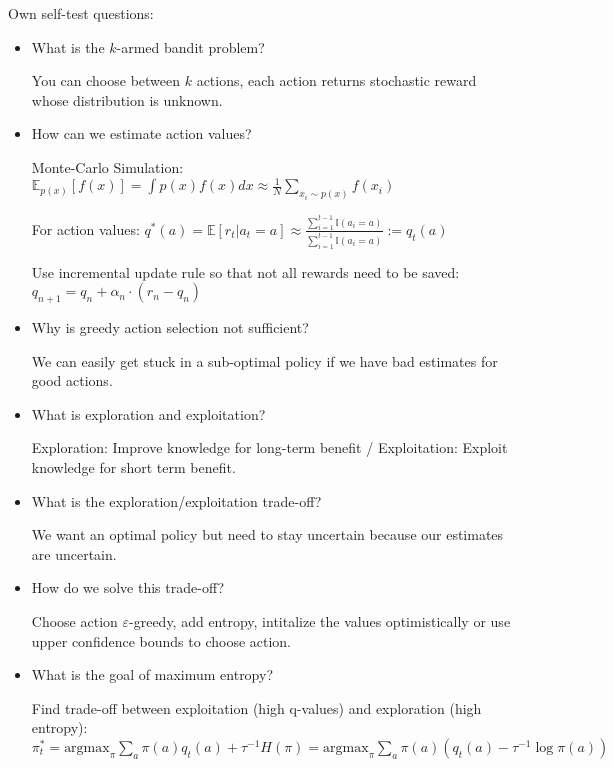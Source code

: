 \documentclass[11pt]{scrartcl}
\begin{document}
Own self-test questions:

\begin{itemize}
    \item What is the $k$-armed bandit problem?
    
    You can choose between $k$ actions, each action returns 
    stochastic reward whose distribution is unknown.

    \item How can we estimate action values?
    
    Monte-Carlo Simulation: $ \mathbb{E}_{p(x)}[f(x)] = \int p(x) f(x) dx \approx \frac{1}{N} \sum_{x_i \sim p(x)}f(x_i)$

    For action values: $ q^*(a) = \mathbb{E}[r_t | a_t = a] \approx \frac{\sum_{i = 1}^{t-1} \mathbb{I}(a_i = a)}{\sum_{i=1}^{t-1} \mathbb{I}(a_i = a)} := q_t(a)$

    Use incremental update rule so that not all rewards need to be saved: $ q_{n+1} = q_n + \alpha_n \cdot (r_n - q_n)$

    \item Why is greedy action selection not sufficient?
    
    We can easily get stuck in a sub-optimal policy if we have bad estimates for good actions.

    \item What is exploration and exploitation?
    
    Exploration: Improve knowledge for long-term benefit / Exploitation: Exploit knowledge for short term benefit.

    \item What is the exploration/exploitation trade-off?
    
    We want an optimal policy but need to stay uncertain because our estimates are uncertain.

    \item How do we solve this trade-off?
    
    Choose action $\varepsilon$-greedy, add entropy, intitalize the values optimistically or use upper confidence bounds to choose action.

    \item What is the goal of maximum entropy?
    
    Find trade-off between exploitation (high q-values) and exploration (high entropy): 
    $ \pi_t^* = \textrm{argmax}_\pi \sum_a \pi(a)q_t(a) + \tau^{-1}H(\pi) = \textrm{argmax}_\pi \sum_a \pi(a)(q_t(a) - \tau^{-1}\log \pi(a)) $


\end{itemize}
\end{document}
